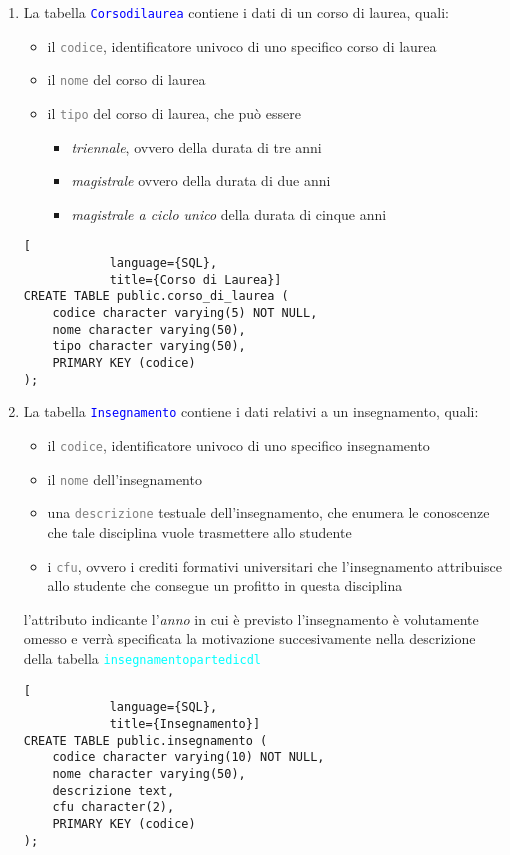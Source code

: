 \documentclass{article}
\newcommand{\tabb}[1]{\texttt{\textcolor{blue}{#1}}}
\newcommand{\tab}[1]{\texttt{\textcolor{cyan}{#1}}}
\newcommand{\attr}[1]{\texttt{\textcolor{gray}{#1}}}
\newcommand{\und}[0]{\textunderscore}
\newcommand{\alert}[0]{\textcolor{red}{\faExclamationCircle}}
\begin{document}
\begin{enumerate}
        \item La tabella \tabb{Corso\und di\und laurea} contiene i dati di un corso di laurea, quali:
        \begin{itemize}
            \item il \attr{codice}, identificatore univoco di uno specifico corso di laurea
            \item il \attr{nome} del corso di laurea
            \item il \attr{tipo} del corso di laurea, che può essere
            \begin{itemize}
                \item \textit{triennale}, ovvero della durata di tre anni
                \item \textit{magistrale} ovvero della durata di due anni
                \item \textit{magistrale a ciclo unico} della durata di cinque anni
            \end{itemize}
        \end{itemize}
        \begin{lstlisting}[
            language={SQL},
            title={Corso di Laurea}]
CREATE TABLE public.corso_di_laurea (
    codice character varying(5) NOT NULL,
    nome character varying(50),
    tipo character varying(50),
    PRIMARY KEY (codice)
);
        \end{lstlisting}

        \item La tabella \tabb{Insegnamento} contiene i dati relativi a un insegnamento, quali:
        \begin{itemize}
            \item il \attr{codice}, identificatore univoco di uno specifico insegnamento
            \item il \attr{nome} dell'insegnamento
            \item una \attr{descrizione} testuale dell'insegnamento, che enumera le conoscenze che tale disciplina vuole trasmettere allo studente
            \item i \attr{cfu}, ovvero i crediti formativi universitari che l'insegnamento attribuisce allo studente che consegue un profitto in questa disciplina
        \end{itemize}
        \alert l'attributo indicante l'\textit{anno} in cui è previsto l'insegnamento è volutamente omesso e verrà specificata la motivazione succesivamente nella descrizione della tabella \tab{insegnamento\und parte\und di\und cdl}
        \begin{lstlisting}[
            language={SQL},
            title={Insegnamento}]
CREATE TABLE public.insegnamento (
    codice character varying(10) NOT NULL,
    nome character varying(50),
    descrizione text,
    cfu character(2),
    PRIMARY KEY (codice)
);
        \end{lstlisting}


\end{enumerate}
\end{document}
